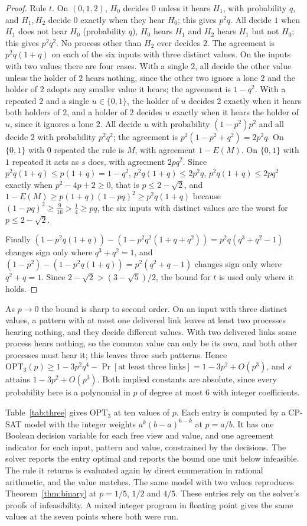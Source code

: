 \documentclass[11pt]{article}
\theoremstyle{remark}
\newcommand{\OPT}{\mathrm{OPT}}
\begin{document}
\begin{proof}
Rule $t$. On $(0,1,2)$, $H_0$ decides $0$ unless it hears $H_1$, with probability $q$, and $H_1,H_2$ decide $0$ exactly when they hear $H_0$; this gives $p^2q$. All decide $1$ when $H_1$ does not hear $H_0$ (probability $q$), $H_0$ hears $H_1$ and $H_2$ hears $H_1$ but not $H_0$; this gives $p^2q^2$. No process other than $H_2$ ever decides $2$. The agreement is $p^2q(1+q)$ on each of the six inputs with three distinct values. On the inputs with two values there are four cases. With a single $2$, all decide the other value unless the holder of $2$ hears nothing, since the other two ignore a lone $2$ and the holder of $2$ adopts any smaller value it hears; the agreement is $1-q^2$. With a repeated $2$ and a single $u\in\{0,1\}$, the holder of $u$ decides $2$ exactly when it hears both holders of $2$, and a holder of $2$ decides $u$ exactly when it hears the holder of $u$, since it ignores a lone $2$. All decide $u$ with probability $(1-p^2)p^2$ and all decide $2$ with probability $p^2q^2$; the agreement is $p^2(1-p^2+q^2)=2p^2q$. On $\{0,1\}$ with $0$ repeated the rule is $M$, with agreement $1-E(M)$. On $\{0,1\}$ with $1$ repeated it acts as $s$ does, with agreement $2pq^2$. Since $p^2q(1+q)\le p(1+q)=1-q^2$, $p^2q(1+q)\le2p^2q$, $p^2q(1+q)\le 2pq^2$ exactly when $p^2-4p+2\ge0$, that is $p\le2-\sqrt2$, and $1-E(M)\ge p(1+q)(1-pq)^2\ge p^2q(1+q)$ because $(1-pq)^2\ge\tfrac9{16}>\tfrac14\ge pq$, the six inputs with distinct values are the worst for $p\le2-\sqrt2$.

Finally $(1-p^2q(1+q))-(1-p^2q^2(1+q+q^2))=p^2q(q^3+q^2-1)$ changes sign only where $q^3+q^2=1$, and $(1-p^2)-(1-p^2q(1+q))=p^2(q^2+q-1)$ changes sign only where $q^2+q=1$. Since $2-\sqrt2>(3-\sqrt5)/2$, the bound for $t$ is used only where it holds.
\end{proof}

As $p\to0$ the bound is sharp to second order. On an input with three distinct values, a pattern with at most one delivered link leaves at least two processes hearing nothing, and they decide different values. With two delivered links some process hears nothing, so the common value can only be its own, and both other processes must hear it; this leaves three such patterns. Hence $\OPT_3(p)\ge 1-3p^2q^4-\Pr[\text{at least three links}]=1-3p^2+O(p^3)$, and $s$ attains $1-3p^2+O(p^3)$. Both implied constants are absolute, since every probability here is a polynomial in $p$ of degree at most $6$ with integer coefficients.

Table~\ref{tab:three} gives $\OPT_3$ at ten values of $p$. Each entry is computed by a CP-SAT model \cite{ORTools} with the integer weights $a^k(b-a)^{6-k}$ at $p=a/b$. It has one Boolean decision variable for each free view and value, and one agreement indicator for each input, pattern and value, constrained by the decisions. The solver reports the entry optimal and reports the bound one unit below infeasible. The rule it returns is evaluated again by direct enumeration in rational arithmetic, and the value matches. The same model with two values reproduces Theorem~\ref{thm:binary} at $p=1/5$, $1/2$ and $4/5$. These entries rely on the solver's proofs of infeasibility. A mixed integer program in floating point gives the same values at the seven points where both were run.
\end{document}
